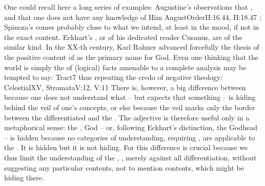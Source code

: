 \pa One could recall here a long series of examples: Augustine's observations
that , and that one does not have any
knowledge of Him \citet{except that which knows that it knows nothing about
  Him}{AugustOrder}{II:16.44, II:18.47 }; Spinoza's
 comes probably close to what we intend, at least in
the mood, if not in the exact content. Eckhart's , or
 of his dedicated reader Cusanus, are of the similar kind.
In the XX-th century, Karl Rahner advanced forcefully the thesis of the positive
content of  as the primary name for God.  Even
one thinking that the world is simply the  of (logical) facts amenable to a
complete analysis may be tempted to say: \citet{What we cannot speak about we
  must pass over in silence,}{Tract}{7} thus repeating the credo of negative theology:
\citet{and the hidden Mysteries which lie beyond our view we have honoured by
  silence}{Celestial}{XV}, \citet{God is invisible and beyond expression by words
  [... We apprehend] not what He is, but what He is not.}{Stromata}{V:12, V:11}
There is, however, a big difference between  because
one does not understand what -- but expects that something -- is hiding behind
the veil of one's concepts, or else because the veil marks only the
 border between the differentiated and the .  The
adjective  is therefore useful only in a metaphorical sense: the
, God -- or, following Eckhart's distinction, the Godhead -- is hidden because no
 categories of understanding, requiring , are
applicable to the . It is hidden but it is not hiding. For
 this difference is crucial because we thus limit the
understanding of the , , merely
against all differentiation, without suggesting any particular contents, not to
mention  contents, which might be hiding there.



